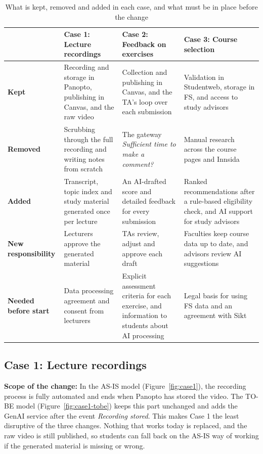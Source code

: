 \begin{table}[H]
    \centering
    \small
    \begin{tabularx}{\textwidth}{|p{}|X|X|X|}
        \hline
         & \textbf{Case 1: Lecture recordings} & \textbf{Case 2: Feedback on exercises} & \textbf{Case 3: Course selection} \\
        \hline
        \textbf{Kept} & Recording and storage in Panopto, publishing in Canvas, and the raw video & Collection and publishing in Canvas, and the TA's loop over each submission & Validation in Studentweb, storage in FS, and access to study advisors \\
        \hline
        \textbf{Removed} & Scrubbing through the full recording and writing notes from scratch & The gateway \textit{Sufficient time to make a comment?} & Manual research across the course pages and Innsida \\
        \hline
        \textbf{Added} & Transcript, topic index and study material generated once per lecture & An AI-drafted score and detailed feedback for every submission & Ranked recommendations after a rule-based eligibility check, and AI support for study advisors \\
        \hline
        \textbf{New responsibility} & Lecturers approve the generated material & TAs review, adjust and approve each draft & Faculties keep course data up to date, and advisors review AI suggestions \\
        \hline
        \textbf{Needed before start} & Data processing agreement and consent from lecturers & Explicit assessment criteria for each exercise, and information to students about AI processing & Legal basis for using FS data and an agreement with Sikt \\
        \hline
    \end{tabularx}
    \caption{What is kept, removed and added in each case, and what must be in place before the change}
    \label{tab:transition}
\end{table}


\subsection{Case 1: Lecture recordings}

\textbf{Scope of the change:}
In the AS-IS model (Figure~\ref{fig:case1}), the recording process is fully automated and ends when Panopto has stored the video. The TO-BE model (Figure~\ref{fig:case1-tobe}) keeps this part unchanged and adds the GenAI service after the event \textit{Recording stored}. This makes Case 1 the least disruptive of the three changes. Nothing that works today is replaced, and the raw video is still published, so students can fall back on the AS-IS way of working if the generated material is missing or wrong. %

